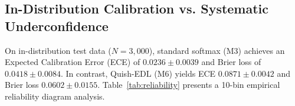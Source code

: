 \documentclass[conference]{IEEEtran}
\begin{document}
\begin{table}[htbp]
\caption{Zero-Shot Out-of-Domain Cross-Dataset Generalization}
\label{tab:cross_dataset}
\centering
{}
\end{table}

\subsection{In-Distribution Calibration vs. Systematic Underconfidence}
On in-distribution test data ($N=3,000$), standard softmax (M3) achieves an Expected Calibration Error (ECE) of $0.0236 \pm 0.0039$ and Brier loss of $0.0418 \pm 0.0084$. In contrast, Quish-EDL (M6) yields ECE $0.0871 \pm 0.0042$ and Brier loss $0.0602 \pm 0.0155$. Table~\ref{tab:reliability} presents a 10-bin empirical reliability diagram analysis.
\end{document}
